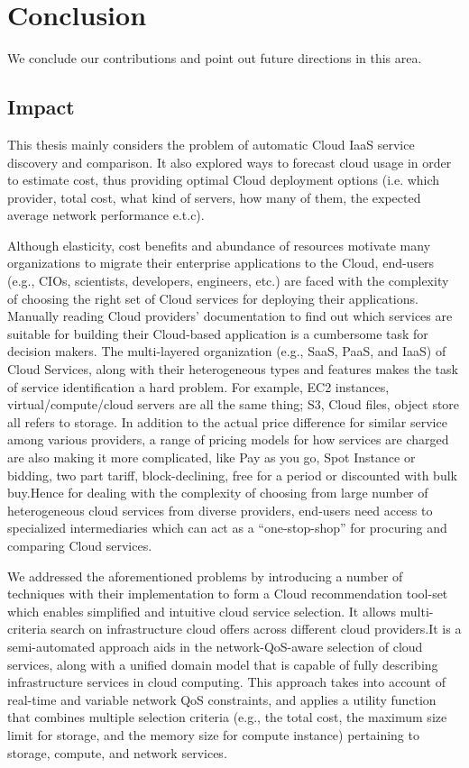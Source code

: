\chapter{Conclusion}
\label{cha:conclusion}
We conclude our contributions and point out future directions in this area.

\section{Impact}
This thesis mainly considers the problem of automatic Cloud IaaS service discovery and comparison.
It also explored ways to forecast cloud usage in order to estimate cost, thus providing optimal Cloud deployment options (i.e. which provider, total cost, what kind of servers, how many of them, the expected average network performance e.t.c).  

Although elasticity, cost benefits and abundance of resources motivate many organizations to migrate their enterprise applications to the Cloud, end-users (e.g., CIOs, scientists, developers, engineers, etc.) are faced with the complexity of choosing the right set of Cloud services for deploying their applications. Manually reading Cloud providers’ documentation to find out which services are suitable for building their Cloud-based application is a cumbersome task for decision makers. The multi-layered organization (e.g., SaaS, PaaS, and IaaS) of Cloud Services, along with their heterogeneous types and features makes the task of service identification a hard problem. For example, EC2 instances, virtual/compute/cloud servers are all the same thing; S3, Cloud files, object store all refers to storage. In addition to the actual price difference for similar service among various providers, a range of pricing models for how services are charged are also making it more complicated, like Pay as you go, Spot Instance or bidding, two part tariff, block-declining, free for a period or discounted with bulk buy.Hence for dealing with the complexity of choosing from large number of heterogeneous cloud services from diverse providers, end-users need access to specialized intermediaries which can act as a “one-stop-shop” for procuring and comparing Cloud services. 

We addressed the aforementioned problems by introducing a number of techniques with their implementation to form a Cloud recommendation tool-set which enables simplified and intuitive cloud service selection. It allows multi-criteria search on infrastructure cloud offers across different cloud providers.It is a semi-automated approach aids in the network-QoS-aware 
selection of cloud services, along with a unified domain model that
is capable of fully describing infrastructure services in cloud
computing. This approach takes into account of real-time and variable network QoS constraints,
and applies a utility function that combines multiple selection criteria
(e.g., the total cost, the maximum size limit for
storage, and the memory size for compute instance)
pertaining to storage, compute, and network services.

